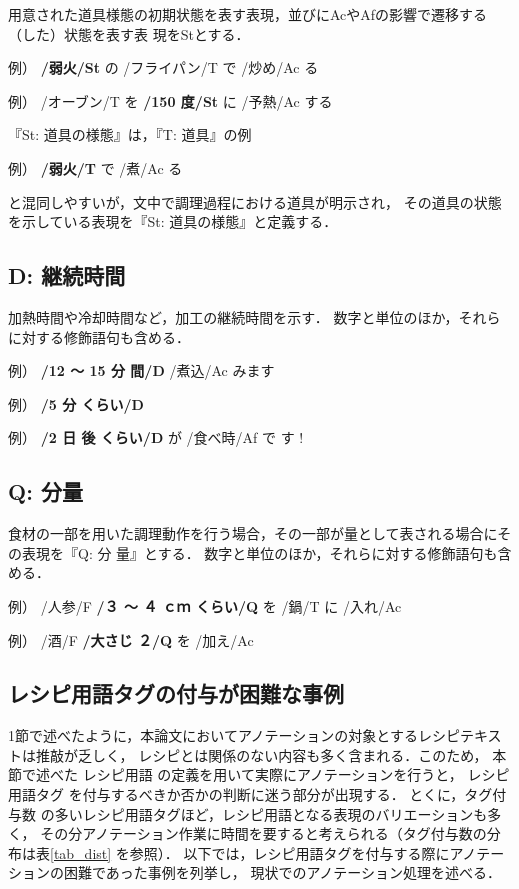 \documentclass[japanese]{jnlp_1.4}
\begin{document}
用意された道具様態の初期状態を表す表現，並びにAcやAfの影響で遷移する（した）状態を表す表
現をStとする．

\quad \noindent 例） {\bf /弱火/St} の /フライパン/T で /炒め/Ac る

\quad \noindent 例） /オーブン/T を {\bf /150 度/St} に /予熱/Ac する

『St: 道具の様態』は，『T: 道具』の例

\quad \noindent 例） {\bf /弱火/T} で /煮/Ac る

と混同しやすいが，文中で調理過程における道具が明示され，
その道具の状態を示している表現を『St: 道具の様態』と定義する．


\subsection{D: 継続時間}

加熱時間や冷却時間など，加工の継続時間を示す．
数字と単位のほか，それらに対する修飾語句も含める．

\quad \noindent 例） {\bf /12 〜 15 分 間/D} /煮込/Ac みます

\quad \noindent 例） {\bf /5 分 くらい/D} 

\quad \noindent 例） {\bf /2 日 後 くらい/D} が /食べ時/Af で す !


\subsection{Q: 分量}

食材の一部を用いた調理動作を行う場合，その一部が量として表される場合にその表現を『Q: 分
量』とする．
数字と単位のほか，それらに対する修飾語句も含める．

\quad \noindent 例） /人参/F  {\bf /３ 〜 ４ ｃｍ くらい/Q} を /鍋/T に /入れ/Ac

\quad \noindent 例） /酒/F  {\bf /大さじ ２/Q} を /加え/Ac


\subsection{レシピ用語タグの付与が困難な事例}
\label{dfne}

1節で述べたように，本論文においてアノテーションの対象とするレシピテキストは推敲が乏しく，
レシピとは関係のない内容も多く含まれる．このため，
本節で述べた
レシピ用語
の定義を用いて実際にアノテーションを行うと，
レシピ用語タグ
を付与するべきか否かの判断に迷う部分が出現する．
とくに，タグ付与数
の多いレシピ用語タグほど，レシピ用語となる表現のバリエーションも多く，
その分アノテーション作業に時間を要すると考えられる（タグ付与数の分布は表\ref{tab_dist}
を参照）．
以下では，レシピ用語タグを付与する際にアノテーションの困難であった事例を列挙し，
現状でのアノテーション処理を述べる．
\end{document}
